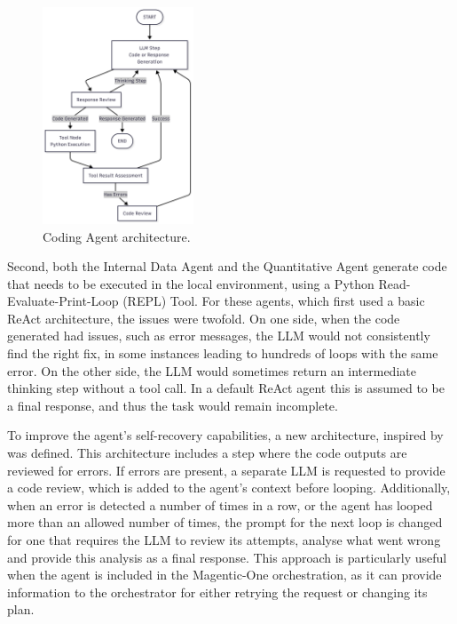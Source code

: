 \documentclass[a4paper]{report}
\begin{document}
\begin{figure}[h]
\centering
\includegraphics[width=0.4\textwidth]{images/coding-workflow.png}
\caption{Coding Agent architecture.}
\label{fig:coding-workflow}
\end{figure}

Second, both the Internal Data Agent and the Quantitative Agent generate code that needs to be executed in the local environment, using a Python Read-Evaluate-Print-Loop (REPL) Tool. For these agents, which first used a basic ReAct architecture, the issues were twofold. On one side, when the code generated had issues, such as error messages, the LLM would not consistently find the right fix, in some instances leading to hundreds of loops with the same error. On the other side, the LLM would sometimes return an intermediate thinking step without a tool call. In a default ReAct agent this is assumed to be a final response, and thus the task would remain incomplete.

To improve the agent's self-recovery capabilities, a new architecture, inspired by \cite{shinn2023reflexion} was defined. This architecture includes a step where the code outputs are reviewed for errors. If errors are present, a separate LLM is requested to provide a code review, which is added to the agent's context before looping. Additionally, when an error is detected a number of times in a row, or the agent has looped more than an allowed number of times, the prompt for the next loop is changed for one that requires the LLM to review its attempts, analyse what went wrong and provide this analysis as a final response. This approach is particularly useful when the agent is included in the Magentic-One orchestration, as it can provide information to the orchestrator for either retrying the request or changing its plan.
\end{document}
